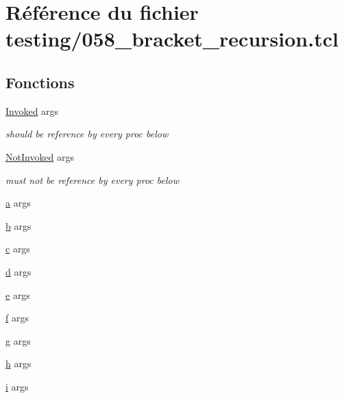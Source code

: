 \hypertarget{058__bracket__recursion_8tcl}{}\section{Référence du fichier testing/058\+\_\+bracket\+\_\+recursion.tcl}
\label{058__bracket__recursion_8tcl}
\subsection*{Fonctions}
\begin{DoxyCompactItemize}
\item 
\hyperlink{058__bracket__recursion_8tcl_aa889853547f65a22ae133cd57ff89601}{Invoked} args
\begin{DoxyCompactList}\small\item\em should be reference by every proc below \end{DoxyCompactList}\item 
\hyperlink{058__bracket__recursion_8tcl_a3f55465410c57ed00ab28827a741b1c3}{Not\+Invoked} args
\begin{DoxyCompactList}\small\item\em must not be reference by every proc below \end{DoxyCompactList}\item 
\hyperlink{058__bracket__recursion_8tcl_ab08ae027fc5777bc4f0629f1b60b35db}{a} args
\item 
\hyperlink{058__bracket__recursion_8tcl_a68bdb74c144118d936931c46f75d4b3e}{b} args
\item 
\hyperlink{058__bracket__recursion_8tcl_ab14f56bc3bd7680490ece4ad7815465f}{c} args
\item 
\hyperlink{058__bracket__recursion_8tcl_af43f4b1f0064a33b2d662af9f06d3a00}{d} args
\item 
\hyperlink{058__bracket__recursion_8tcl_aff65a51a703804e0ad1adbcfd76c86f8}{e} args
\item 
\hyperlink{058__bracket__recursion_8tcl_af6830d2c644b45088ea8f1f74a46b778}{f} args
\item 
\hyperlink{058__bracket__recursion_8tcl_af08b4b5bfa9edf0b0a7dee1c2b2c29e0}{g} args
\item 
\hyperlink{058__bracket__recursion_8tcl_af96fd0966e32a310a0778d2e5c357700}{h} args
\item 
\hyperlink{058__bracket__recursion_8tcl_a8c90afd4641b25be86bd09983c3cbee0}{i} args
\item 

\end{DoxyCompactItemize}
